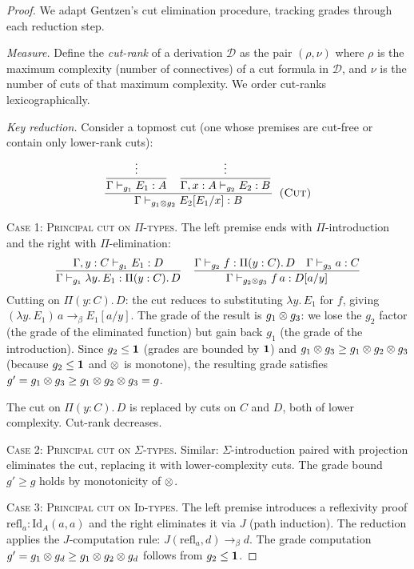 \begin{proof}
We adapt Gentzen's cut elimination procedure, tracking grades through
each reduction step.

\emph{Measure.}  Define the \emph{cut-rank} of a derivation $\mathcal{D}$
as the pair $(\rho, \nu)$ where $\rho$ is the maximum complexity
(number of connectives) of a cut formula in $\mathcal{D}$, and $\nu$
is the number of cuts of that maximum complexity.  We order cut-ranks
lexicographically.

\emph{Key reduction.}  Consider a topmost cut (one whose premises
are cut-free or contain only lower-rank cuts):
\[
  \dfrac{\dfrac{\vdots}{\Gamma \vdash_{g_1} E_1 : A}
    \quad
    \dfrac{\vdots}{\Gamma, x:A \vdash_{g_2} E_2 : B}}
    {\Gamma \vdash_{g_1 \otimes g_2} E_2[E_1/x] : B}
  \;\;\textsc{(Cut)}
\]

\textsc{Case 1: Principal cut on $\Pi$-types.}
The left premise ends with $\Pi$-introduction and the right with
$\Pi$-elimination:
\begin{gather*}
  \dfrac{\Gamma, y:C \vdash_{g_1} E_1 : D}
    {\Gamma \vdash_{g_1} \lambda y.\,E_1 : \Pi(y:C).\,D}
  \quad
  \dfrac{\Gamma \vdash_{g_2} f : \Pi(y:C).\,D \quad
    \Gamma \vdash_{g_3} a : C}
    {\Gamma \vdash_{g_2 \otimes g_3} f\,a : D[a/y]}
\end{gather*}
Cutting on $\Pi(y:C).\,D$: the cut reduces to substituting $\lambda
y.\,E_1$ for $f$, giving $(\lambda y.\,E_1)\,a \to_\beta E_1[a/y]$.
The grade of the result is $g_1 \otimes g_3$: we lose the $g_2$ factor
(the grade of the eliminated function) but gain back $g_1$ (the
grade of the introduction).  Since $g_2 \leq \mathbf{1}$ (grades are
bounded by $\mathbf{1}$) and $g_1 \otimes g_3 \geq g_1 \otimes g_2 \otimes g_3$
(because $g_2 \leq \mathbf{1}$ and $\otimes$ is monotone), the resulting
grade satisfies $g' = g_1 \otimes g_3 \geq g_1 \otimes g_2 \otimes g_3 = g$.

The cut on $\Pi(y:C).\,D$ is replaced by cuts on $C$ and $D$, both
of lower complexity.  Cut-rank decreases.

\textsc{Case 2: Principal cut on $\Sigma$-types.}
Similar: $\Sigma$-introduction paired with projection eliminates the
cut, replacing it with lower-complexity cuts.  The grade bound
$g' \geq g$ holds by monotonicity of $\otimes$.

\textsc{Case 3: Principal cut on $\mathrm{Id}$-types.}
The left premise introduces a reflexivity proof
$\mathrm{refl}_a : \mathrm{Id}_A(a,a)$ and the right eliminates it
via $J$ (path induction).  The reduction applies the $J$-computation
rule: $J(\mathrm{refl}_a, d) \to_\beta d$.  The grade computation
$g' = g_1 \otimes g_d \geq g_1 \otimes g_2 \otimes g_d$ follows from
$g_2 \leq \mathbf{1}$.


\end{proof}
